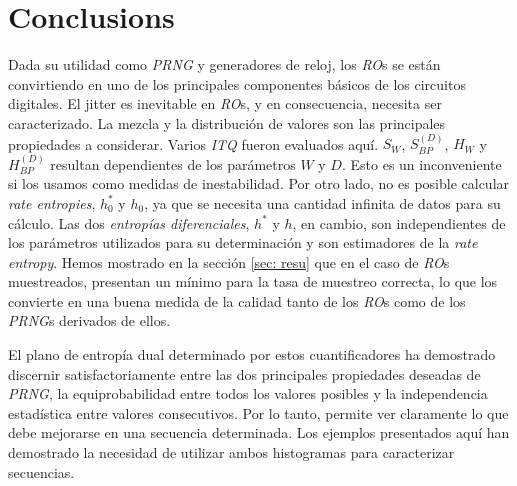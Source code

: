 \section{Conclusions}
\label{sec:conclu}

Dada su utilidad como \emph{PRNG} y generadores de reloj, los \emph{RO}s se están convirtiendo en uno de los principales componentes básicos de los circuitos digitales.
El jitter es inevitable en \emph{RO}s, y en consecuencia, necesita ser caracterizado.
La mezcla y la distribución de valores son las principales propiedades a considerar.
Varios \emph{ITQ} fueron evaluados aquí.
$S_W$, $S^{(D)}_{BP}$, $H_W$ y $H^{(D)}_{BP}$ resultan dependientes de los parámetros $W$ y $D$.
Esto es un inconveniente si los usamos como medidas de inestabilidad.
Por otro lado, no es posible calcular \emph{rate entropies}, $h_0^*$ y $h_0$, ya que se necesita una cantidad infinita de datos para su cálculo.
Las dos \emph{entropías diferenciales}, $h^*$ y $h$, en cambio, son independientes de los parámetros utilizados para su determinación y son estimadores de la \emph{rate entropy}.
Hemos mostrado en la sección \ref{sec: resu} que en el caso de \emph{RO}s muestreados, presentan un mínimo para la tasa de muestreo correcta, lo que los convierte en una buena medida de la calidad tanto de los \emph{RO}s como de los \emph{PRNG}s derivados de ellos.

El plano de entropía dual determinado por estos cuantificadores ha demostrado discernir satisfactoriamente entre las dos principales propiedades deseadas de \emph{PRNG}, la equiprobabilidad entre todos los valores posibles y la independencia estadística entre valores consecutivos.
Por lo tanto, permite ver claramente lo que debe mejorarse en una secuencia determinada.
Los ejemplos presentados aquí han demostrado la necesidad de utilizar ambos histogramas para caracterizar secuencias.